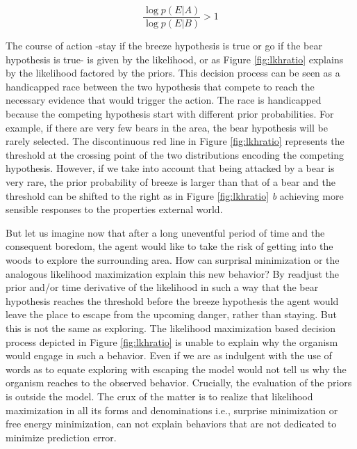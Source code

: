 \documentclass[11pt,twocolumn]{article}
\begin{document}
\begin{equation}
 \frac{\log p(E|A)}{\log p(E|B)} > 1 
\label{eq:lkhratio}
\end{equation}

The course of action -stay if the breeze hypothesis is true or go if the bear hypothesis is true- is given by the likelihood, or as Figure \ref{fig:lkhratio} explains by the likelihood factored by the priors. This decision process can be seen as a handicapped race between the two hypothesis that compete to reach the necessary evidence that would trigger the action. The race is handicapped because the competing hypothesis start with different prior probabilities. For example, if there are very few bears in the area, the bear hypothesis will be rarely selected. 
The discontinuous red line in  Figure \ref{fig:lkhratio} represents the threshold at the crossing point of the two distributions encoding the competing hypothesis. 
However, if we take into account that being attacked by a bear is very rare, the prior probability of breeze is larger than that of a bear and the threshold can be shifted to the right as in Figure  \ref{fig:lkhratio} \emph{b} achieving more sensible responses to the properties external world.
     
But let us imagine now that after a long uneventful period of time and the consequent boredom, the agent would like to take the risk of getting into the woods to explore the surrounding area. 
How can surprisal minimization or the analogous likelihood maximization explain this new behavior? By readjust the prior and/or time derivative of the likelihood in such a way that the bear hypothesis reaches the threshold before the breeze hypothesis the agent would leave the place to escape from the upcoming danger, rather than staying. But this is not the same as exploring. 
The likelihood maximization based decision process depicted in Figure \ref{fig:lkhratio} is unable to explain why the organism would engage in such a behavior. Even if we are as indulgent with the use of words as to equate exploring with escaping the model would not tell us why the organism reaches to the observed behavior. Crucially, the evaluation of the priors is outside the model. 
The crux of the matter is to realize that likelihood maximization in all its forms and denominations i.e., surprise minimization or free energy minimization, can not explain behaviors that are not dedicated to minimize prediction error.
\end{document}
